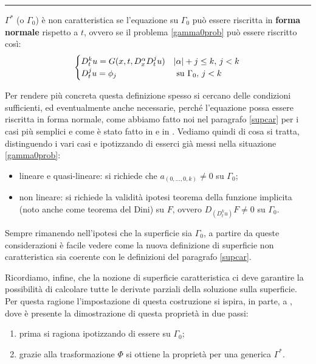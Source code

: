 \noindent\rule[0.5ex]{\linewidth}{0.2pt}

\begin{definition}
$\Gamma^*$ (o $\Gamma_0$) è non caratteristica se l'equazione su $\Gamma_0$ può essere riscritta in \textbf{forma normale} rispetto a $t$, ovvero se il problema \eqref{gamma0prob} può essere riscritto così:
\begin{equation*}
\begin{cases}
D_{t}^k u = G(x,t, D^\alpha_x D^j_t u) & |\alpha |+ j \leq k, \, j<k \\
D_t^ju = \phi_j & \text{ su } \Gamma_0, \, j<k
\end{cases} \\
\end{equation*}
\end{definition}

Per rendere più concreta questa definizione spesso si cercano delle condizioni sufficienti, ed eventualmente anche necessarie, perché l'equazione possa essere riscritta in forma normale, come abbiamo fatto noi nel paragrafo \ref{supcar} per i casi più semplici e come è stato fatto in \cite{Evans} e in \cite{Folland}.
Vediamo quindi di cosa si tratta, distinguendo i vari casi e ipotizzando di esserci già messi nella situazione \eqref{gamma0prob}:
\begin{itemize}
\item lineare e quasi-lineare: si richiede che $a_{(0,\ldots ,0,k)} \neq 0$ su $\Gamma_0$;
\item non lineare: si richiede la validità ipotesi teorema della funzione implicita (noto anche come teorema del Dini) su $F$, ovvero $D_{(D^k_t u)} F \neq 0$ su $\Gamma_0$.
\end{itemize}

\begin{remark}
Sempre rimanendo nell'ipotesi che la superficie sia $\Gamma_0$, a partire da queste considerazioni è facile vedere come la nuova definizione di superficie non caratteristica sia coerente con le definizioni del paragrafo \ref{supcar}.
\end{remark}

Ricordiamo, infine, che la nozione di superficie caratteristica ci deve garantire la possibilità di calcolare tutte le derivate parziali della soluzione sulla superficie. Per questa ragione l'impostazione di questa costruzione si ispira, in parte, a \cite[cap.3]{Evans}, dove è presente la dimostrazione di questa proprietà in due passi:
\begin{enumerate}
\item prima si ragiona ipotizzando di essere su $\Gamma_0$;
\item grazie alla trasformazione $\Phi$ si ottiene la proprietà per una generica $\Gamma^*$.
\end{enumerate}


